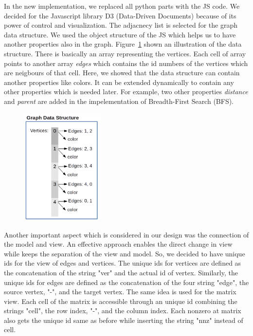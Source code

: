 \documentclass[12pt, oneside]{book}
\begin{document}
In the new implementation, we replaced all python parts with the JS code.
We decided for the Javascript library D3 (Data-Driven Documents) 
because of its power of control and visualization.
The adjacnecy list is selected for the graph data structure.
We used the object structure of the JS which helps us to have another
properties also in the graph. Figure~\ref{f.graph-ds} shown an illustration
of the data structure. There is basically an array representing the vertices.
Each cell of array points to another array \textit{edges} which contains
the id numbers of the vertices which are neigbours of that cell.
Here, we showed that the data structure can contain another properties like colors.
It can be extended dynamically to contain any other properties which is needed later.
For example, two other properties \textit{distance} and \textit{parent} are added
in the impelementation of Breadth-First Search (BFS).

\begin{figure}
\centering
\includegraphics[width=0.38\textwidth]{graph}
\caption{}
\label{f.graph-ds}
\end{figure}

Another important aspect which is considered in our design was the connection of the 
model and view. An effective approach enables the direct change in view while keeps the 
separation of the view and model. So, we decided to have unique ids for the view of
edges and vertices. The unique ids for vertices are defined as the concatenation of the
string "ver" and the actual id of vertex. Similarly, the unique ids for edges are
defined as the concatenation of the four string "edge", the source vertex, "-", 
and the target vertex. The same idea is used for the matrix view. Each cell of the matrix
is accessible through an unique id combining the strings "cell", the row index,
"-", and the column index. Each nonzero at matrix also gets the unique id same as before 
while inserting the string "nnz" instead of cell.
\end{document}
